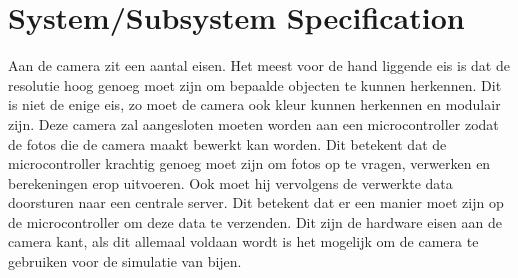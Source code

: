 \section{System/Subsystem Specification}
Aan de camera zit een aantal eisen. Het meest voor de hand liggende eis is dat de resolutie hoog genoeg moet zijn om bepaalde objecten te kunnen herkennen. Dit is niet de enige eis, zo moet de camera ook kleur kunnen herkennen en modulair zijn. 
Deze camera zal aangesloten moeten worden aan een microcontroller zodat de fotos die de camera maakt bewerkt kan worden. Dit betekent dat de microcontroller krachtig genoeg moet zijn om fotos op te vragen, verwerken en berekeningen erop uitvoeren. Ook moet hij vervolgens de verwerkte data doorsturen naar een centrale server. Dit betekent dat er een manier moet zijn op de microcontroller om deze data te verzenden.
Dit zijn de hardware eisen aan de camera kant, als dit allemaal voldaan wordt is het mogelijk om de camera te gebruiken voor de simulatie van bijen.